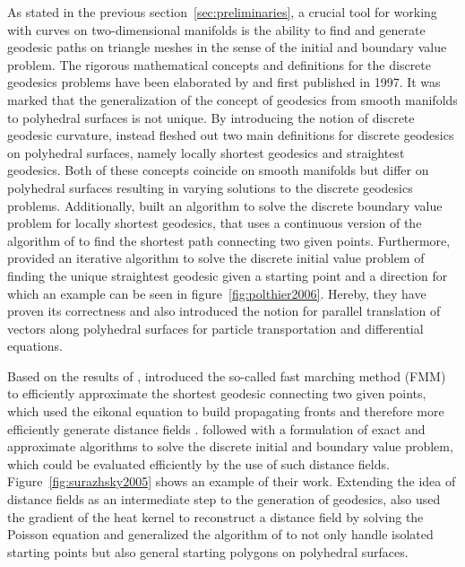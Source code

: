 \documentclass{stdlocal}
\begin{document}
As stated in the previous section~\ref{sec:preliminaries}, a crucial tool for working with curves on two-dimensional manifolds is the ability to find and generate geodesic paths on triangle meshes in the sense of the initial and boundary value problem.
The rigorous mathematical concepts and definitions for the discrete geodesics problems have been elaborated by \textcite{mitchell1987} and \textcite{polthier2006} first published in 1997.
It was marked that the generalization of the concept of geodesics from smooth manifolds to polyhedral surfaces is not unique.
By introducing the notion of discrete geodesic curvature, \textcite{polthier2006} instead fleshed out two main definitions for discrete geodesics on polyhedral surfaces, namely locally shortest geodesics and straightest geodesics.
Both of these concepts coincide on smooth manifolds but differ on polyhedral surfaces resulting in varying solutions to the discrete geodesics problems.
Additionally, \textcite{mitchell1987} built an algorithm to solve the discrete boundary value problem for locally shortest geodesics, that uses a continuous version of the algorithm of \textcite{dijkstra1959} to find the shortest path connecting two given points.
Furthermore, \textcite{polthier2006} provided an iterative algorithm to solve the discrete initial value problem of finding the unique straightest geodesic given a starting point and a direction for which an example can be seen in figure~\ref{fig:polthier2006}.
Hereby, they have proven its correctness and also introduced the notion for parallel translation of vectors along polyhedral surfaces for particle transportation and differential equations.

Based on the results of \textcite{mitchell1987}, \citeauthor{kimmel1998} introduced the so-called fast marching method (FMM) to efficiently approximate the shortest geodesic connecting two given points, which used the eikonal equation to build propagating fronts and therefore more efficiently generate distance fields \autocite{sethian1996,kimmel1996,kimmel1998}.
\textcite{surazhsky2005} followed with a formulation of exact and approximate algorithms to solve the discrete initial and boundary value problem, which could be evaluated efficiently by the use of such distance fields.
Figure~\ref{fig:surazhsky2005} shows an example of their work.
Extending the idea of distance fields as an intermediate step to the generation of geodesics, \textcite{crane2013} also used the gradient of the heat kernel to reconstruct a distance field by solving the Poisson equation and \textcite{bommes2007} generalized the algorithm of \textcite{surazhsky2005} to not only handle isolated starting points but also general starting polygons on polyhedral surfaces.
\end{document}
